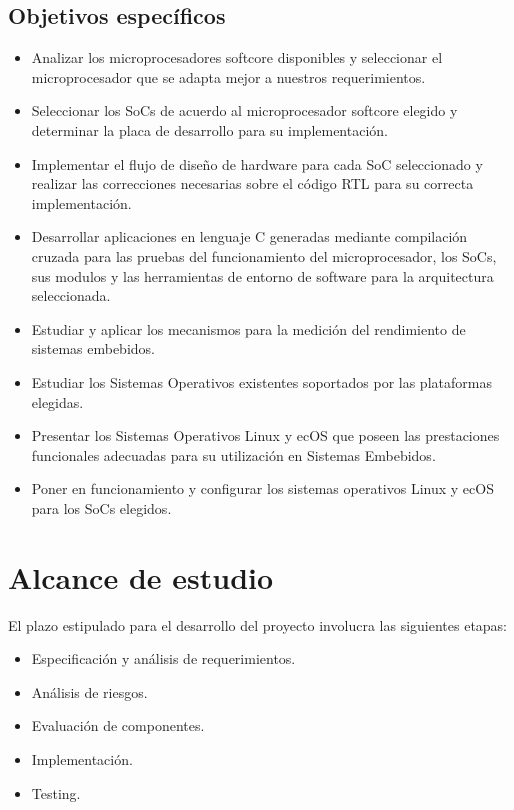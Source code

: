 \subsection{Objetivos específicos}
  \begin{itemize}
 \item Analizar los microprocesadores softcore disponibles y seleccionar el microprocesador que se adapta mejor a nuestros requerimientos.

\item Seleccionar los SoCs de acuerdo al microprocesador softcore elegido y determinar la placa de desarrollo para su implementación.

\item Implementar el flujo de diseño de hardware para cada SoC seleccionado y realizar las correcciones necesarias sobre el código RTL para su correcta implementación. 
\item Desarrollar  aplicaciones en lenguaje C generadas mediante compilación cruzada para las pruebas del funcionamiento del microprocesador, los SoCs, sus modulos y las herramientas de entorno de software para la arquitectura seleccionada.
\item Estudiar y aplicar los mecanismos para la medición del rendimiento de sistemas embebidos. 
\item Estudiar los Sistemas Operativos existentes soportados por las plataformas elegidas.
\item Presentar los Sistemas Operativos Linux y ecOS que poseen las prestaciones funcionales adecuadas para su utilización en Sistemas Embebidos.
\item Poner en funcionamiento y configurar los sistemas operativos Linux y ecOS para los SoCs elegidos.
 \end{itemize}


\section{Alcance de estudio}

El plazo estipulado para el desarrollo del proyecto involucra las siguientes etapas:

\begin{itemize}
\item Especificación y análisis de requerimientos.
\item Análisis de riesgos.
\item Evaluación de componentes.
\item Implementación.
\item Testing.
\end{itemize}

